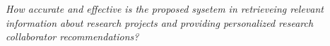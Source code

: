 \textit{How accurate and effective is the proposed sysetem in retrieveing relevant information about research projects and providing personalized research collaborator recommendations?}